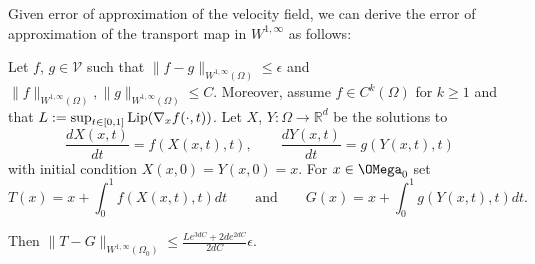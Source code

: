 Given error of approximation of the velocity field, we can derive the error of approximation of the transport map in $W^{1,\infty}$ as follows:
\begin{theorem}\label{thm:FlowMapBound}
Let $f$, $g\in\mathcal{V}$ such that $\|f - g\|_{W^{1,\infty}(\Omega)}\leq \epsilon$ and $\|f\|_{W^{1,\infty}(\Omega)}, \|g\|_{W^{1,\infty}(\Omega)}\leq C$. Moreover, assume $f\in C^k(\Omega)$ for $k \geq 1$ and that 
$L:=\sup_{t\in [0,1]}{\rm Lip}(\nabla_x f(\cdot,t))$.
 Let $X$, $Y:\Omega\to\mathbb{R}^d$ be the solutions to 
 \begin{equation*}
 \frac{dX(x,t)}{dt} = f(X(x,t),t),\qquad \frac{dY(x,t)}{dt} = g(Y(x,t),t) 
 \end{equation*}
 with initial condition $X(x,0) = Y(x,0) = x$.
For $x\in \OMega_0$ set
\begin{equation*}
T(x) = x + \int_0^1f(X(x,t),t)dt\qquad\text{and}\qquad G(x) = x + \int_0^1g(Y(x,t),t)dt.
\end{equation*}

Then $\|T - G\|_{W^{1, \infty}(\Omega_0)} \leq   \frac{Le^{3dC} + 2de^{2dC}}{2dC}\epsilon$.
\end{theorem}
